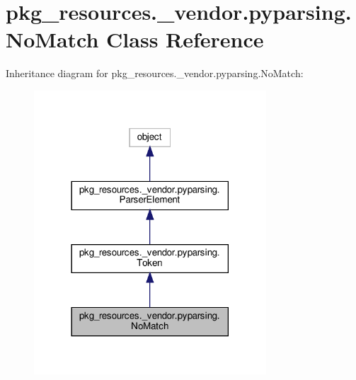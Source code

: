 \hypertarget{classpkg__resources_1_1__vendor_1_1pyparsing_1_1NoMatch}{}\section{pkg\+\_\+resources.\+\_\+vendor.\+pyparsing.\+No\+Match Class Reference}
\label{classpkg__resources_1_1__vendor_1_1pyparsing_1_1NoMatch}


Inheritance diagram for pkg\+\_\+resources.\+\_\+vendor.\+pyparsing.\+No\+Match\+:
\nopagebreak
\begin{figure}[H]
\begin{center}
\leavevmode
\includegraphics[width=246pt]{classpkg__resources_1_1__vendor_1_1pyparsing_1_1NoMatch__inherit__graph}
\end{center}
\end{figure}


